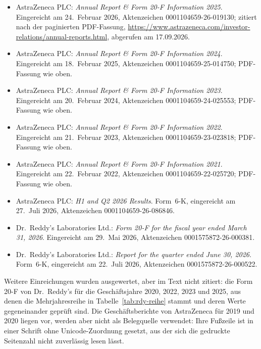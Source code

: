 \begin{itemize}
\item \label{quelle:gb2025} AstraZeneca PLC: \emph{Annual Report \& Form 20-F
Information 2025}. Eingereicht am 24.~Februar 2026, Aktenzeichen
0001104659-26-019130; zitiert nach der paginierten PDF-Fassung,
\url{https://www.astrazeneca.com/investor-relations/annual-reports.html},
abgerufen am 17.09.2026.
\item \label{quelle:gb2024} AstraZeneca PLC: \emph{Annual Report \& Form 20-F
Information 2024}. Eingereicht am 18.~Februar 2025, Aktenzeichen
0001104659-25-014750; PDF-Fassung wie oben.
\item \label{quelle:gb2023} AstraZeneca PLC: \emph{Annual Report \& Form 20-F
Information 2023}. Eingereicht am 20.~Februar 2024, Aktenzeichen
0001104659-24-025553; PDF-Fassung wie oben.
\item \label{quelle:gb2022} AstraZeneca PLC: \emph{Annual Report \& Form 20-F
Information 2022}. Eingereicht am 21.~Februar 2023, Aktenzeichen
0001104659-23-023818; PDF-Fassung wie oben.
\item \label{quelle:gb2021} AstraZeneca PLC: \emph{Annual Report \& Form 20-F
Information 2021}. Eingereicht am 22.~Februar 2022, Aktenzeichen
0001104659-22-025720; PDF-Fassung wie oben.
\item \label{quelle:hj} AstraZeneca PLC: \emph{H1 and Q2 2026 Results}.
Form~6-K, eingereicht am 27.~Juli 2026, Aktenzeichen 0001104659-26-086846.
\item \label{quelle:zf2026} Dr.~Reddy's Laboratories Ltd.: \emph{Form 20-F for
the fiscal year ended March 31, 2026}. Eingereicht am 29.~Mai 2026,
Aktenzeichen 0001575872-26-000381.
\item \label{quelle:qb} Dr.~Reddy's Laboratories Ltd.: \emph{Report for the
quarter ended June 30, 2026}. Form~6-K, eingereicht am 22.~Juli 2026,
Aktenzeichen 0001575872-26-000522.
\end{itemize}

Weitere Einreichungen wurden ausgewertet, aber im Text nicht zitiert: die
Form 20-F von Dr.~Reddy's f\"ur die Gesch\"aftsjahre 2020, 2022, 2023 und
2025, aus denen die Mehrjahresreihe in Tabelle~\ref{tab:rdy-reihe} stammt und
deren Werte gegeneinander gepr\"uft sind. Die Gesch\"aftsberichte von
AstraZeneca f\"ur 2019 und 2020 liegen vor, werden aber nicht als Belegquelle
verwendet: Ihre Fu{\ss}zeile ist in einer Schrift ohne Unicode-Zuordnung
gesetzt, aus der sich die gedruckte Seitenzahl nicht zuverl\"assig lesen
l\"asst.

